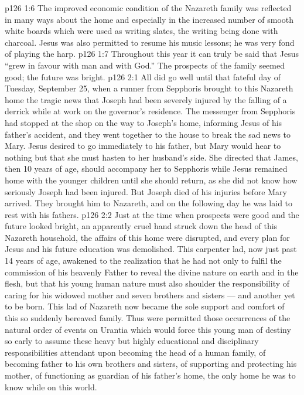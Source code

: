 \vs p126 1:6 The improved economic condition of the Nazareth family was reflected in many ways about the home and especially in the increased number of smooth white boards which were used as writing slates, the writing being done with charcoal. Jesus was also permitted to resume his music lessons; he was very fond of playing the harp.
\vs p126 1:7 \pc Throughout this year it can truly be said that Jesus “grew in favour with man and with God.” The prospects of the family seemed good; the future was bright.
\vs p126 2:1 All did go well until that fateful day of Tuesday, September 25, when a runner from Sepphoris brought to this Nazareth home the tragic news that Joseph had been severely injured by the falling of a derrick while at work on the governor’s residence. The messenger from Sepphoris had stopped at the shop on the way to Joseph’s home, informing Jesus of his father’s accident, and they went together to the house to break the sad news to Mary. Jesus desired to go immediately to his father, but Mary would hear to nothing but that she must hasten to her husband’s side. She directed that James, then 10 years of age, should accompany her to Sepphoris while Jesus remained home with the younger children until she should return, as she did not know how seriously Joseph had been injured. But Joseph died of his injuries before Mary arrived. They brought him to Nazareth, and on the following day he was laid to rest with his fathers.
\vs p126 2:2 \pc Just at the time when prospects were good and the future looked bright, an apparently cruel hand struck down the head of this Nazareth household, the affairs of this home were disrupted, and every plan for Jesus and his future education was demolished. This carpenter lad, now just past 14 years of age, awakened to the realization that he had not only to fulfil the commission of his heavenly Father to reveal the divine nature on earth and in the flesh, but that his young human nature must also shoulder the responsibility of caring for his widowed mother and seven brothers and sisters --- and another yet to be born. This lad of Nazareth now became the sole support and comfort of this so suddenly bereaved family. Thus were permitted those occurrences of the natural order of events on Urantia which would force this young man of destiny so early to assume these heavy but highly educational and disciplinary responsibilities attendant upon becoming the head of a human family, of becoming father to his own brothers and sisters, of supporting and protecting his mother, of functioning as guardian of his father’s home, the only home he was to know while on this world.
